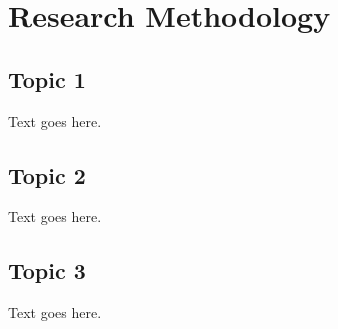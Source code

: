 \chapter{Research Methodology}


\section{Topic 1}

Text goes here.

\section{Topic 2}

Text goes here.

\section{Topic 3}

Text goes here.

